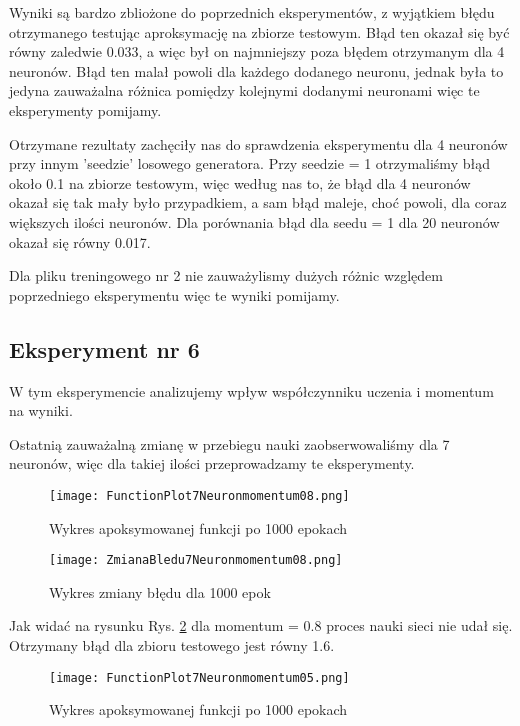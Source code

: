 \documentclass[12pt]{article}
\begin{document}
\newpage
Wyniki są bardzo zbliożone do poprzednich eksperymentów, z wyjątkiem błędu otrzymanego testując aproksymację na zbiorze testowym. Błąd ten okazał się być równy zaledwie 0.033, a więc był on najmniejszy poza błędem otrzymanym dla 4 neuronów. Błąd ten malał powoli dla każdego dodanego neuronu, jednak była to jedyna zauważalna różnica pomiędzy kolejnymi dodanymi neuronami więc te eksperymenty pomijamy.

Otrzymane rezultaty zachęciły nas do sprawdzenia eksperymentu dla 4 neuronów przy innym 'seedzie' losowego generatora. Przy seedzie = 1 otrzymaliśmy błąd około 0.1 na zbiorze testowym, więc według nas to, że błąd dla 4 neuronów okazał się tak mały było przypadkiem, a sam błąd maleje, choć powoli, dla coraz większych ilości neuronów. Dla porównania błąd dla seedu = 1 dla 20 neuronów okazał się równy 0.017.

Dla pliku treningowego nr 2 nie zauważylismy dużych różnic względem poprzedniego eksperymentu więc te wyniki pomijamy.
\newpage

\subsection{Eksperyment nr 6}
W tym eksperymencie analizujemy wpływ współczynniku uczenia i momentum na wyniki.

Ostatnią zauważalną zmianę w przebiegu nauki zaobserwowaliśmy dla 7 neuronów, więc dla takiej ilości przeprowadzamy te eksperymenty.

\begin{figure}[!htb]
 \centering
 \texttt{[image: FunctionPlot7Neuronmomentum08.png]}
 \caption{Wykres apoksymowanej funkcji po 1000 epokach}
 \vspace{-0.3cm}
 \label{WykresFun8}
\end{figure}



\begin{figure}[!htb]
 \centering
 \texttt{[image: ZmianaBledu7Neuronmomentum08.png]}
 \vspace{-0.3cm}
 \caption{Wykres zmiany błędu dla 1000 epok}
 \label{WykresBlad8}
\end{figure}
\newpage
Jak widać na rysunku Rys. \ref{WykresBlad8} dla momentum = 0.8 proces nauki sieci nie udał się. Otrzymany błąd dla zbioru testowego jest równy 1.6.

\begin{figure}[!htb]
 \centering
 \texttt{[image: FunctionPlot7Neuronmomentum05.png]}
 \caption{Wykres apoksymowanej funkcji po 1000 epokach}
 \vspace{-0.3cm}
 \label{WykresFun9}
\end{figure}
\end{document}
